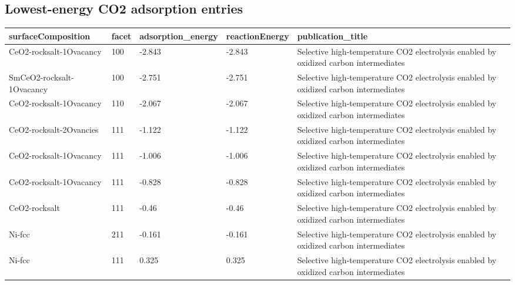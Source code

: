 \documentclass[11pt]{article}
\begin{document}
\subsection{Lowest-energy CO2 adsorption entries}
\begin{center}
\small
\begin{tabular}{| p{} | p{} | p{} | p{} | p{} |}
\hline
surfaceComposition & facet & adsorption\_energy & reactionEnergy & publication\_title \\
\hline
CeO2-rocksalt-1Ovacancy & 100 & -2.843 & -2.843 & Selective high-temperature CO2 electrolysis enabled by oxidized carbon intermediates \\
\hline
SmCeO2-rocksalt-1Ovacancy & 100 & -2.751 & -2.751 & Selective high-temperature CO2 electrolysis enabled by oxidized carbon intermediates \\
\hline
CeO2-rocksalt-1Ovacancy & 110 & -2.067 & -2.067 & Selective high-temperature CO2 electrolysis enabled by oxidized carbon intermediates \\
\hline
CeO2-rocksalt-2Ovancies & 111 & -1.122 & -1.122 & Selective high-temperature CO2 electrolysis enabled by oxidized carbon intermediates \\
\hline
CeO2-rocksalt-1Ovacancy & 111 & -1.006 & -1.006 & Selective high-temperature CO2 electrolysis enabled by oxidized carbon intermediates \\
\hline
CeO2-rocksalt-1Ovacancy & 111 & -0.828 & -0.828 & Selective high-temperature CO2 electrolysis enabled by oxidized carbon intermediates \\
\hline
CeO2-rocksalt & 111 & -0.46 & -0.46 & Selective high-temperature CO2 electrolysis enabled by oxidized carbon intermediates \\
\hline
Ni-fcc & 211 & -0.161 & -0.161 & Selective high-temperature CO2 electrolysis enabled by oxidized carbon intermediates \\
\hline
Ni-fcc & 111 & 0.325 & 0.325 & Selective high-temperature CO2 electrolysis enabled by oxidized carbon intermediates \\
\hline
\end{tabular}
\normalsize
\end{center}
\end{document}
